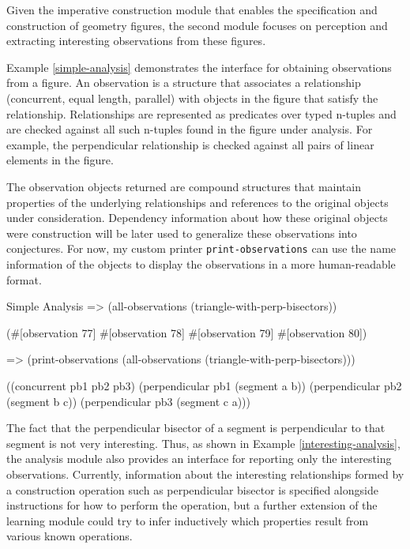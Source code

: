 Given the imperative construction module that enables the
specification and construction of geometry figures, the second module
focuses on perception and extracting interesting observations from
these figures.

Example \ref{simple-analysis} demonstrates the interface for obtaining
observations from a figure. An observation is a structure that
associates a relationship (concurrent, equal length, parallel) with
objects in the figure that satisfy the relationship. Relationships are
represented as predicates over typed n-tuples and are checked against
all such n-tuples found in the figure under analysis. For example, the
perpendicular relationship is checked against all pairs of linear elements
in the figure.

The observation objects returned are compound structures that maintain
properties of the underlying relationships and references to the
original objects under consideration. Dependency information about how
these original objects were construction will be later used to
generalize these observations into conjectures. For now, my custom
printer \texttt{print-observations} can use the name information of
the objects to display the observations in a more human-readable
format.

\begin{repl-example}
[label=simple-analysis]
{Simple Analysis}
=> (all-observations (triangle-with-perp-bisectors))

(#[observation 77] #[observation 78] #[observation 79] #[observation 80])

=> (print-observations (all-observations (triangle-with-perp-bisectors)))

((concurrent pb1 pb2 pb3)
 (perpendicular pb1 (segment a b))
 (perpendicular pb2 (segment b c))
 (perpendicular pb3 (segment c a)))
\end{repl-example}

The fact that the perpendicular bisector of a segment is perpendicular
to that segment is not very interesting. Thus, as shown in Example
\ref{interesting-analysis}, the analysis module also provides an
interface for reporting only the interesting observations. Currently,
information about the interesting relationships formed by a
construction operation such as perpendicular bisector is specified
alongside instructions for how to perform the operation, but a further
extension of the learning module could try to infer inductively which
properties result from various known operations.

